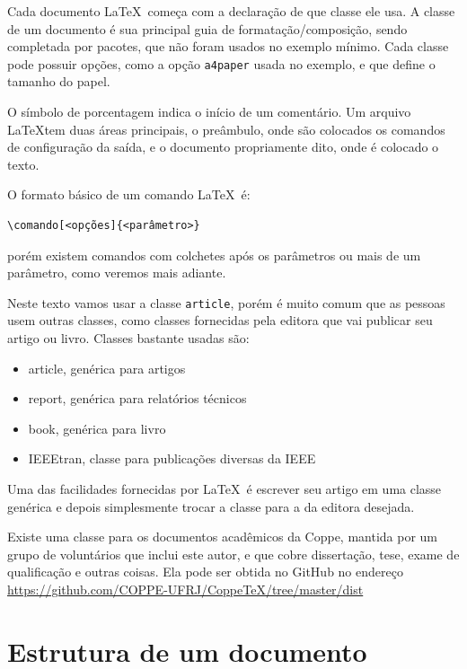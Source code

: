 Cada documento \LaTeX\ começa com a declaração de que classe ele usa. A classe de um documento é sua principal guia de formatação/composição, sendo completada por
pacotes, que não foram usados no exemplo mínimo. Cada classe pode possuir opções, como a opção \verb|a4paper| usada no exemplo, e que define o tamanho do papel.

O símbolo de porcentagem indica o início de um comentário. Um arquivo \LaTeX tem duas áreas principais, o preâmbulo, onde são colocados os comandos de configuração da saída, e o documento propriamente dito, onde é colocado o texto.

O formato básico de um comando \LaTeX\ é:
\begin{verbatim}
\comando[<opções]{<parâmetro>}
\end{verbatim}
porém existem comandos com colchetes após os parâmetros ou mais de um parâmetro, como veremos mais adiante.

Neste texto vamos usar a classe \texttt{article}, porém é muito comum que as pessoas usem outras classes, como classes fornecidas pela editora que vai
publicar seu artigo ou livro. Classes bastante usadas são:
\begin{itemize}
    \item article, genérica para artigos
    \item report, genérica para relatórios técnicos
    \item book, genérica para livro
    \item IEEEtran, classe para publicações diversas da IEEE
\end{itemize}

Uma das facilidades fornecidas por \LaTeX\ é escrever seu artigo em uma classe genérica e depois simplesmente trocar a classe para a da editora desejada.

 Existe uma classe para os documentos acadêmicos da Coppe, mantida por um grupo de voluntários que inclui este autor, e que cobre dissertação, tese, exame de qualificação e outras coisas. Ela pode ser obtida no GitHub no endereço
 \url{https://github.com/COPPE-UFRJ/CoppeTeX/tree/master/dist}

\section{Estrutura de um documento}

